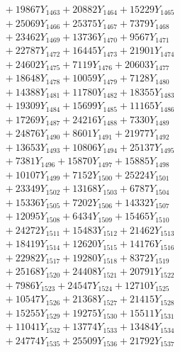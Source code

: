 \documentclass[a4paper,10pt]{article}
\begin{document}
{\begin{align}
&\;  + 19867 Y_{1463} + 20882 Y_{1464} + 15229 Y_{1465} \\[0.3ex]
&\;  + 25069 Y_{1466} + 25375 Y_{1467} + 7379 Y_{1468} \\[0.5ex]\allowbreak
&\;  + 23462 Y_{1469} + 13736 Y_{1470} + 9567 Y_{1471} \\[0.3ex]
&\;  + 22787 Y_{1472} + 16445 Y_{1473} + 21901 Y_{1474} \\[0.3ex]
&\;  + 24602 Y_{1475} + 7119 Y_{1476} + 20603 Y_{1477} \\[0.3ex]
&\;  + 18648 Y_{1478} + 10059 Y_{1479} + 7128 Y_{1480} \\[0.3ex]
&\;  + 14388 Y_{1481} + 11780 Y_{1482} + 18355 Y_{1483} \\[0.3ex]
&\;  + 19309 Y_{1484} + 15699 Y_{1485} + 11165 Y_{1486} \\[0.3ex]
&\;  + 17269 Y_{1487} + 24216 Y_{1488} + 7330 Y_{1489} \\[0.3ex]
&\;  + 24876 Y_{1490} + 8601 Y_{1491} + 21977 Y_{1492} \\[0.3ex]
&\;  + 13653 Y_{1493} + 10806 Y_{1494} + 25137 Y_{1495} \\[0.3ex]
&\;  + 7381 Y_{1496} + 15870 Y_{1497} + 15885 Y_{1498} \\[0.5ex]\allowbreak
&\;  + 10107 Y_{1499} + 7152 Y_{1500} + 25224 Y_{1501} \\[0.3ex]
&\;  + 23349 Y_{1502} + 13168 Y_{1503} + 6787 Y_{1504} \\[0.3ex]
&\;  + 15336 Y_{1505} + 7202 Y_{1506} + 14332 Y_{1507} \\[0.3ex]
&\;  + 12095 Y_{1508} + 6434 Y_{1509} + 15465 Y_{1510} \\[0.3ex]
&\;  + 24272 Y_{1511} + 15483 Y_{1512} + 21462 Y_{1513} \\[0.3ex]
&\;  + 18419 Y_{1514} + 12620 Y_{1515} + 14176 Y_{1516} \\[0.3ex]
&\;  + 22982 Y_{1517} + 19280 Y_{1518} + 8372 Y_{1519} \\[0.3ex]
&\;  + 25168 Y_{1520} + 24408 Y_{1521} + 20791 Y_{1522} \\[0.3ex]
&\;  + 7986 Y_{1523} + 24547 Y_{1524} + 12710 Y_{1525} \\[0.3ex]
&\;  + 10547 Y_{1526} + 21368 Y_{1527} + 21415 Y_{1528} \\[0.5ex]\allowbreak
&\;  + 15255 Y_{1529} + 19275 Y_{1530} + 15511 Y_{1531} \\[0.3ex]
&\;  + 11041 Y_{1532} + 13774 Y_{1533} + 13484 Y_{1534} \\[0.3ex]
&\;  + 24774 Y_{1535} + 25509 Y_{1536} + 21792 Y_{1537} \\[0.3ex]

\end{align}}
\end{document}
